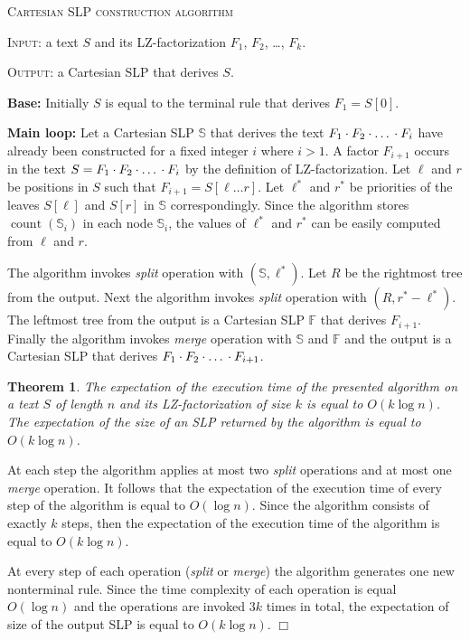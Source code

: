 ﻿\documentclass[11pt]{article}
\newtheorem{thm}{Theorem}[section]
\theoremstyle{remark}
\newcommand{\qqed}{\hfill$\Box$}
\renewenvironment{proof}{\trivlist\item[\hskip\labelsep{\bf Proof}.] }{\qqed\endtrivlist}
\newcommand{\header}[1]{
    \noindent \textsc{#1}
}
\newcommand{\substr}[2]{[#1\dots#2]}
\newcommand{\slp}[1]{\mathbb{#1}}
\newcommand{\concat}[4]{
    #1_{#2} \cdot #1_{#3} \cdot \mbox{\dots} \cdot #1_{#4}
}
\DeclareMathOperator{\cnt}{count} \DeclareMathOperator{\splt}{\emph{split}}
\begin{document}
\medskip

\header{Cartesian SLP construction algorithm}

\header{Input:} a text $S$ and its LZ-factorization $F_1$, $F_2$, \dots, $F_k$.

\header{Output:} a Cartesian SLP that derives $S$.

\smallskip

\noindent\textbf{Base:} Initially $S$ is equal to the terminal rule that derives $F_1 = S[0]$.

\smallskip

\noindent\textbf{Main loop:} Let a Cartesian SLP $\slp{S}$ that derives the text $\concat{F}{1}{2}{i}$ have already been
constructed for a fixed integer $i$ where $i > 1$. A factor $F_{i+1}$ occurs in the text $S=\concat{F}{1}{2}{i}$ by the definition of
LZ-factorization. Let $\ell$ and $r$ be positions in $S$ such that $F_{i+1}=S\substr{\ell}{r}$. Let
$\ell^*$ and $r^*$ be priorities of the leaves $S[\ell]$ and $S[r]$ in $\slp{S}$ correspondingly. Since the algorithm
stores $\cnt(\slp{S}_i)$ in each node $\slp{S}_i$, the values of $\ell^*$ and $r^*$ can be easily computed
from $\ell$ and $r$.

The algorithm invokes \emph{split} operation with $(\slp{S}, \ell^*)$. Let $R$ be the rightmost tree from the output. 
Next the algorithm invokes \emph{split} operation with $(R,r^*-\ell^*)$. The leftmost tree from the output is a Cartesian SLP 
$\slp{F}$ that derives $F_{i+1}$. Finally the algorithm invokes \emph{merge} operation with $\slp{S}$ and $\slp{F}$ and the output is 
a Cartesian SLP that derives $\concat{F}{1}{2}{i+1}$.

\begin{thm}
\label{thm:cartesian} The expectation of the execution time of the presented algorithm on a text $S$ of length $n$
and its LZ-factorization of size $k$ is equal to $O(k\log n)$. The expectation of the size of an SLP returned
by the algorithm is equal to $O(k\log n)$.
\end{thm}

\begin{proof}
At each step the algorithm applies at most two \emph{split} operations and at most one \emph{merge} operation. It follows that 
the expectation of the execution time of every step of the algorithm is equal to $O(\log n)$. Since the algorithm consists of
exactly $k$ steps, then the expectation of the execution time of the algorithm is equal to $O(k \log n)$.

At every step of each operation (\emph{split} or \emph{merge}) the algorithm generates one new nonterminal rule. Since the
time complexity of each operation is equal $O(\log n)$ and the operations are invoked $3k$ times in total, the expectation
of size of the output SLP is equal to $O(k\log n)$.
\end{proof}
\end{document}
